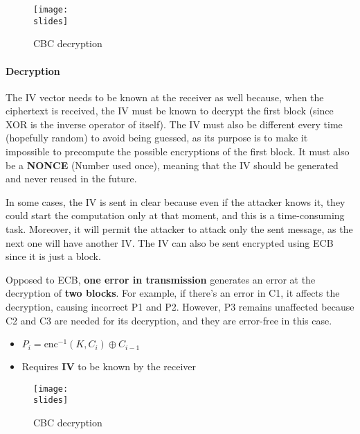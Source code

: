\begin{figure}[H]
    \centering
    \texttt{[image: \\slides]}
    \caption{CBC decryption}
\end{figure}


\paragraph*{Decryption}
The IV vector needs to be known at the receiver as well because, when the ciphertext is received, the IV must be known to decrypt the first block (since XOR is the inverse operator of itself).
The IV must also be different every time (hopefully random) to avoid being guessed, as its purpose is to make it impossible to precompute the possible encryptions of the first block.
It must also be a \textbf{NONCE} (Number used once), meaning that the IV should be generated and never reused in the future.

In some cases, the IV is sent in clear because even if the attacker knows it, they could start the computation only at that moment, and this is a time-consuming task. Moreover, it will permit the attacker to attack only the sent message, as the next one will have another IV.
The IV can also be sent encrypted using ECB since it is just a block.

Opposed to ECB, \textbf{one error in transmission} generates an error at the
decryption of \textbf{two blocks}. For example, if there's an error in C1, it affects the decryption, causing incorrect P1 and P2. However, P3 remains unaffected because C2 and C3 are needed for its decryption, and they are error-free in this case.


\begin{itemize}
    \item $P_i = \text{enc}^{-1}(K, C_i ) \oplus C_{i-1}$
    \item Requires \textbf{IV} to be known by the receiver
\end{itemize}


\begin{figure}[H]
    \centering
    \texttt{[image: \\slides]}
    \caption{CBC decryption}
\end{figure}



